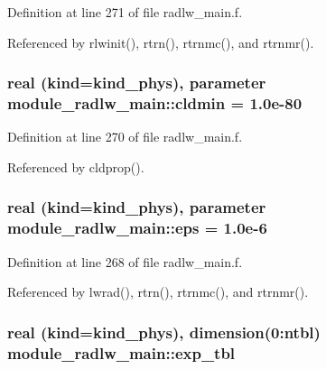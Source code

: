 Definition at line 271 of file radlw\+\_\+main.\+f.



Referenced by rlwinit(), rtrn(), rtrnmc(), and rtrnmr().

\subsubsection[{\texorpdfstring{cldmin}{cldmin}}]{\setlength{\rightskip}{0pt plus 5cm}real (kind=kind\+\_\+phys), parameter module\+\_\+radlw\+\_\+main\+::cldmin = 1.\+0e-\/80\hspace{0.3cm}{\ttfamily [private]}}\hypertarget{namespacemodule__radlw__main_ac55ad4a1ff397794e054be6647bafb73}{}\label{namespacemodule__radlw__main_ac55ad4a1ff397794e054be6647bafb73}


Definition at line 270 of file radlw\+\_\+main.\+f.



Referenced by cldprop().

\subsubsection[{\texorpdfstring{eps}{eps}}]{\setlength{\rightskip}{0pt plus 5cm}real (kind=kind\+\_\+phys), parameter module\+\_\+radlw\+\_\+main\+::eps = 1.\+0e-\/6\hspace{0.3cm}{\ttfamily [private]}}\hypertarget{namespacemodule__radlw__main_ac82309fd8d0e351ac37b276833a10376}{}\label{namespacemodule__radlw__main_ac82309fd8d0e351ac37b276833a10376}


Definition at line 268 of file radlw\+\_\+main.\+f.



Referenced by lwrad(), rtrn(), rtrnmc(), and rtrnmr().

\subsubsection[{\texorpdfstring{exp\+\_\+tbl}{exp_tbl}}]{\setlength{\rightskip}{0pt plus 5cm}real (kind=kind\+\_\+phys), dimension(0\+:ntbl) module\+\_\+radlw\+\_\+main\+::exp\+\_\+tbl\hspace{0.3cm}{\ttfamily [private]}}\hypertarget{namespacemodule__radlw__main_ac2f240a927351a68fc9063321a307891}{}\label{namespacemodule__radlw__main_ac2f240a927351a68fc9063321a307891}


